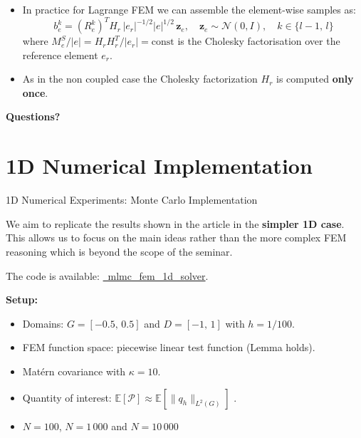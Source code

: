 \documentclass[
  english,            %
  aspectratio=169,    %
]{tumbeamer}
\begin{document}
\begin{frame}


\bigskip
\begin{itemize}
\item In practice for Lagrange FEM we can assemble the element-wise samples as:
\begin{equation}
  b_e^k = (R_e^k)^T H_r\, |e_r|^{-1/2} |e|^{1/2}\, \mathbf{z}_e,
  \quad \mathbf{z}_e \sim \mathcal{N}(0,I),\quad k \in \{l-1,\,l\}
\end{equation}
where $M_e^S / |e| = H_r H_r^T / |e_r| = \mathrm{const}$ is the Cholesky factorisation over the reference element $e_r$. 
\item As in the non coupled case the Cholesky factorization $H_r$ is computed \textbf{only once}.
\end{itemize}
\end{frame}

\begin{frame}{\strut}
    \vfill
    \begin{center}
        {\Huge\bfseries\color{blue} Questions? \par}
    \end{center}
    \vfill
\end{frame}


\section{1D Numerical Implementation}

\begin{frame}{1D Numerical Experiments: Monte Carlo Implementation}

We aim to replicate the results shown in the article in the \textbf{simpler 1D case}. This allows us to focus on the main ideas rather than the more complex FEM reasoning which is beyond the scope of the seminar. 
\bigskip

The code is available: \href{https://github.com/fede-mat/mlmc_fem_1d_solver}{\faGithub\ mlmc\_fem\_1d\_solver}.

\bigskip
\textbf{Setup:}
\begin{itemize}
  \item Domains: $G = [-0.5,\,0.5]$ and $ D = [-1,\,1]$ with \(h = 1/100\).
  \item FEM function space: piecewise linear test function (Lemma holds).
  \item Mat\'ern covariance with $\kappa=10$.
  \item Quantity of interest: $ \mathbb{E}[\mathcal{P}] \approx \mathbb{E}[\|q_h\|_{L^2(G)}] $ .
  \item $N = 100$, $N = 1\,000$ and  $N = 10\,000$  
\end{itemize}

\end{frame}
\end{document}
